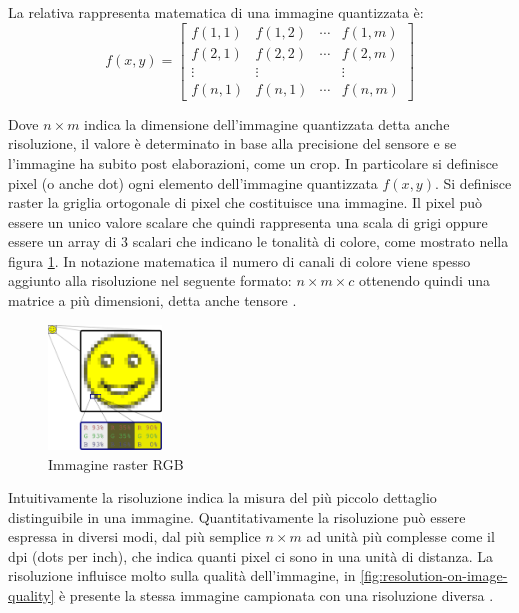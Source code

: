 La relativa rappresenta matematica di una immagine quantizzata è:
\[ f(x, y)=\left[\begin{array}{cccc}f(1,1) & f(1,2) & \cdots & f(1, m) \\ f(2,1) & f(2,2) & \cdots & f(2, m) \\ \vdots & \vdots & & \vdots \\ f(n,1) & f(n,1) & \cdots & f(n,m)\end{array}\right] \]

Dove \(n\times m\) indica la dimensione dell'immagine quantizzata detta anche risoluzione, il valore è determinato in base alla precisione del sensore e se l'immagine ha subito post elaborazioni, come un crop. In particolare si definisce pixel  (o anche dot) ogni elemento dell'immagine quantizzata \(f(x, y)\). Si definisce raster la griglia ortogonale di pixel che costituisce una immagine. Il pixel può essere un unico valore scalare che quindi rappresenta una scala di grigi oppure essere un array di 3 scalari che indicano le tonalità di colore, come mostrato nella figura \cref{fig:rgb-raster-image}. In notazione matematica il numero di canali di colore viene spesso aggiunto alla risoluzione nel seguente formato: \(n\times m \times c\) ottenendo quindi una matrice a più dimensioni, detta anche tensore \cite{gonzalez_dip}.

\begin{figure}[ht]
    \centering
    \includegraphics[width=0.27\textwidth]{frame/Rgb-raster-image.pdf}
    \caption{Immagine raster RGB}
    \label{fig:rgb-raster-image}
\end{figure}

Intuitivamente la risoluzione indica la  misura del più piccolo dettaglio distinguibile in una immagine. Quantitativamente la risoluzione può essere espressa in diversi modi, dal più semplice \(n\times m\) ad unità più complesse come il dpi (dots per inch), che indica quanti pixel ci sono in una unità di distanza. La risoluzione influisce molto sulla qualità dell'immagine, in \cref{fig:resolution-on-image-quality} è presente la stessa immagine campionata con una risoluzione diversa \cite{gonzalez_dip} \cite{spaepen_resolution}.

